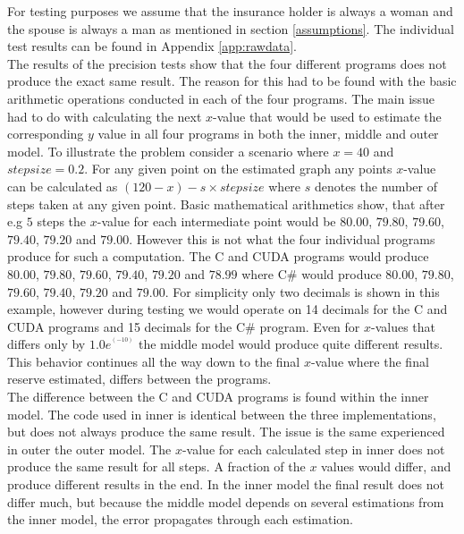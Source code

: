 For testing purposes we assume that the insurance holder is always a woman and the spouse is always a man as mentioned in section \ref{assumptions}. The individual test results can be found in Appendix \ref{app:rawdata}.\\

The results of the precision tests show that the four different programs does not produce the exact same result. The reason for this had to be found with the basic arithmetic operations conducted in each of the four programs. The main issue had to do with calculating the next $x$-value that would be used to estimate the corresponding $y$ value in all four programs in both the inner, middle and outer model. To illustrate the problem consider a scenario where $x = 40$ and $stepsize = 0.2$. For any given point on the estimated graph any points $x$-value can be calculated as $(120-x)-s \times stepsize$ where $s$ denotes the number of steps taken at any given point. Basic mathematical arithmetics show, that after e.g $5$ steps the $x$-value for each intermediate point would be $80.00$, $79.80$, $79.60$, $79.40$, $79.20$ and $79.00$. However this is not what the four individual programs produce for such a computation. The C and CUDA programs would produce $80.00$, $79.80$, $79.60$, $79.40$, $79.20$ and $78.99$ where C\# would produce $80.00$, $79.80$, $79.60$, $79.40$, $79.20$ and $79.00$. For simplicity only two decimals is shown in this example, however during testing we would operate on 14 decimals for the C and CUDA programs and 15 decimals for the C\# program. Even for $x$-values that differs only by $1.0e^^(-10)$ the middle model would produce quite different results. This behavior continues all the way down to the final $x$-value where the final reserve estimated, differs between the programs.\\

The difference between the C and CUDA programs is found within the inner model. The code used in inner is identical between the three implementations, but does not always produce the same result. The issue is the same experienced in outer the outer model. The $x$-value for each calculated step in inner does not produce the same result for all steps. A fraction of the $x$ values would differ, and produce different results in the end. In the inner model the final result does not differ much, but because the middle model depends on several estimations from the inner model, the error propagates through each estimation.\\

